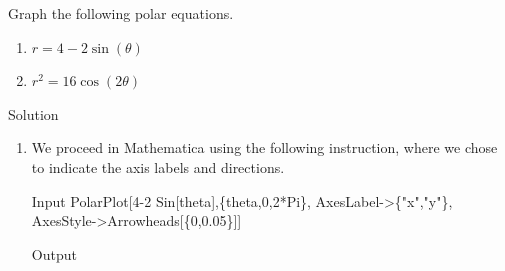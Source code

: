 \begin{example} \label{polargraphex}  Graph the following polar equations.

\begin{multicols}{2}
\begin{enumerate}

\item  \label{limacon01} $r = 4 - 2\sin(\theta)$ 

\item  \label{lemniscate} $r^2 = 16 \cos(2\theta)$

\end{enumerate}
\end{multicols}

Solution 

\begin{enumerate}
\ifmathematica
\item We proceed in Mathematica using the following instruction, where we chose to indicate the axis labels and directions. 
\begin{mdframed}[default,backgroundcolor=gray!40,roundcorner=8pt]
\begin{mmaCell}[morefunctionlocal={theta},moredefined={PolarPlot,Arrowheads}]{Input}
  PolarPlot[4-2 Sin[theta],\{theta,0,2*Pi\}, AxesLabel->\{"x","y"\},
	 AxesStyle->Arrowheads[\{0,0.05\}]]
\end{mmaCell}



\begin{mmaCell}[moregraphics={moreig={scale=.4}}]{Output}
\end{mmaCell}
\end{mdframed}
\fi


\end{enumerate}
\end{example}

